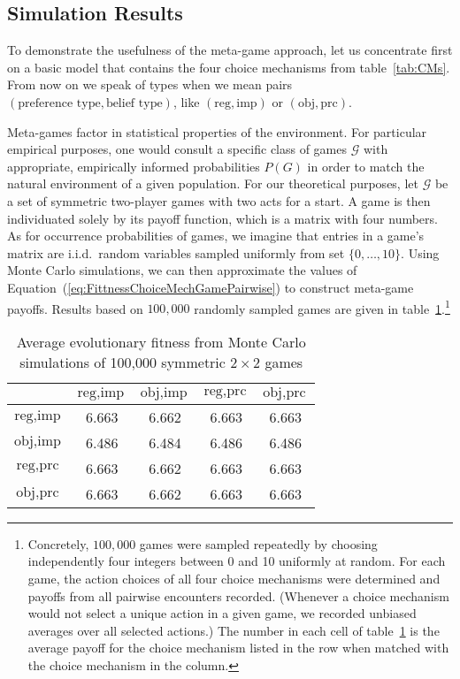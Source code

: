 \documentclass[fleqn,reqno,12pt]{article}
\theoremstyle{Satz}
\theoremstyle{Bsp}
\begin{document}
\subsection{Simulation Results}
\label{sec:simulation-results}

To demonstrate the usefulness of the meta-game approach, let us concentrate first on a basic
model that contains the four choice mechanisms from table~\ref{tab:CMs}. From now on we speak
of types when we mean pairs $(\text{preference type}, \text{belief type})$, like $(\text{reg}, \text{imp})$ or $(\text{obj}, \text{prc})$.

Meta-games factor in statistical properties of the environment. For particular empirical
purposes, one would consult a specific class of games $\mathcal{G}$ with appropriate,
empirically informed probabilities $P(G)$ in order to match the natural environment of a given
population. 
For our theoretical purposes, let $\mathcal{G}$ be a set of
symmetric two-player games with two acts for a start. A game is then individuated solely by its payoff
function, which is a matrix with four numbers. As for occurrence probabilities of
games, we imagine that entries in a game's matrix are i.i.d.~random variables sampled
uniformly from set $ \lbrace 0, \dots, 10 \rbrace$.  Using Monte Carlo simulations, we can then
approximate the values of Equation~(\ref{eq:FittnessChoiceMechGamePairwise})
to construct meta-game payoffs. Results based on $100,000$ randomly sampled games are given in
table~\ref{tab:ExpectedFitness_4Types}.\footnote{Concretely, $100,000$ games were sampled
  repeatedly by choosing independently four integers between 0 and 10 uniformly at random. For
  each game, the action choices of all four choice mechanisms were determined and payoffs from
  all pairwise encounters recorded. (Whenever a choice mechanism would not select a unique
  action in a given game, we recorded unbiased averages over all selected actions.)  The number
  in each cell of table~\ref{tab:ExpectedFitness_4Types} is the average payoff for the choice
  mechanism listed in the row when matched with the choice mechanism in the column.}



\begin{table}[t]
\centering
\begin{tabular}{ccccc}
  \toprule
 & $\text{reg}, \text{imp}$ 
 & $\text{obj}, \text{imp}$ 
 & $\text{reg}, \text{prc}$ 
 & $\text{obj}, \text{prc}$ \\ 
  \midrule
  $\text{reg}, \text{imp}$ & 6.663 & 6.662 & 6.663 & 6.663 \\ 
  $\text{obj}, \text{imp}$ & 6.486 & 6.484 & 6.486 & 6.486 \\ 
  $\text{reg}, \text{prc}$ & 6.663 & 6.662 & 6.663 & 6.663 \\  
  $\text{obj}, \text{prc}$ & 6.663 & 6.662 & 6.663 & 6.663 \\ 
   \bottomrule
\end{tabular}                    
\caption{Average evolutionary fitness from Monte Carlo simulations of 100,000 symmetric $2 \times 2$ games}
\label{tab:ExpectedFitness_4Types}
\end{table}
\end{document}
